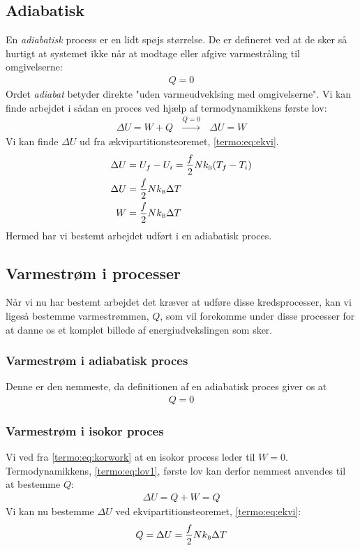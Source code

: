 \documentclass[crop=false, class=memoir]{standalone}
\begin{document}
\subsection{Adiabatisk}
En \emph{adiabatisk} process er en lidt spøjs størrelse. De er defineret ved at de sker så hurtigt at systemet ikke når at modtage eller afgive varmestråling til omgivelserne:
\begin{align}
    Q = 0
\end{align}
Ordet \emph{adiabat} betyder direkte "uden varmeudveklsing med omgivelserne". Vi kan finde arbejdet i sådan en proces ved hjælp af termodynamikkens første lov:
\begin{align}
    \Delta U = W + Q \text{  } \xrightarrow{Q = 0} \text{  } \Delta U = W 
\end{align}
Vi kan finde $\Delta U$ ud fra ækvipartitionsteoremet, \cref{termo:eq:ekvi}.
\begin{align}
    \Delta U &= U_f - U_i = \frac{f}{2} N k_\textsc{b} (T_f - T_i)\\
    \Delta U &= \frac{f}{2} N k_\textsc{b} \Delta T\\
    W &= \frac{f}{2} N k_\textsc{b} \Delta T
\end{align}
Hermed har vi bestemt arbejdet udført i en adiabatisk proces.

\subsection{Varmestrøm i processer}

Når vi nu har bestemt arbejdet det kræver at udføre disse kredsprocesser, kan vi ligeså bestemme varmestrømmen, $Q$, som vil forekomme under disse processer for at danne os et komplet billede af energiudvekslingen som sker.

\subsubsection{Varmestrøm i adiabatisk proces}

Denne er den nemmeste, da definitionen af en adiabatisk proces giver os at
\begin{align}
    Q = 0
\end{align}

\subsubsection{Varmestrøm i isokor proces}

Vi ved fra \cref{termo:eq:korwork} at en isokor process leder til $W = 0$. Termodynamikkens, \cref{termo:eq:lov1}, første lov kan derfor nemmest anvendes til at bestemme $Q$:
\begin{align}
    \Delta U = Q + W = Q
\end{align}
Vi kan nu bestemme $\Delta U$ ved ekvipartitionsteoremet, \cref{termo:eq:ekvi}:
\begin{align}
    Q = \Delta U = \frac{f}{2}N k_\textsc{b} \Delta T
\end{align}
\end{document}
